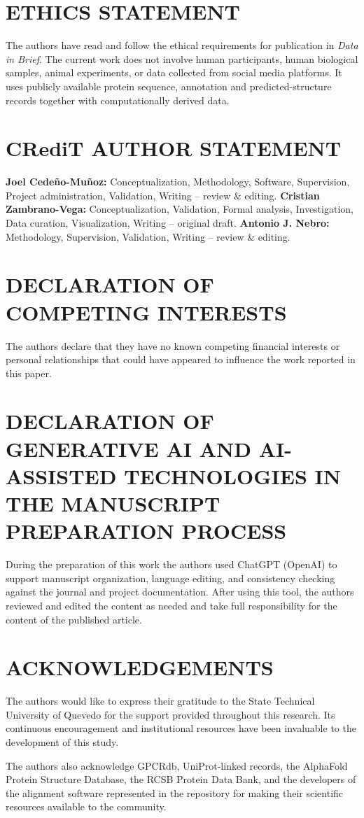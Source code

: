 \documentclass[a4paper,12pt]{article}
\begin{document}
	\section*{ETHICS STATEMENT}
	The authors have read and follow the ethical requirements for publication in \textit{Data in Brief}. The current work does not involve human participants, human biological samples, animal experiments, or data collected from social media platforms. It uses publicly available protein sequence, annotation and predicted-structure records together with computationally derived data.
	
	\section*{CRediT AUTHOR STATEMENT}
	 \textbf{Joel Cede\~no-Mu\~noz:} Conceptualization, Methodology, Software, Supervision, Project administration, Validation, Writing -- review \& editing. \textbf{Cristian Zambrano-Vega:} Conceptualization, Validation, Formal analysis, Investigation, Data curation, Visualization, Writing -- original draft. \textbf{Antonio J. Nebro:} Methodology, Supervision, Validation, Writing -- review \& editing.
	
	\section*{DECLARATION OF COMPETING INTERESTS}
	The authors declare that they have no known competing financial interests or personal relationships that could have appeared to influence the work reported in this paper.
	
	\section*{DECLARATION OF GENERATIVE AI AND AI-ASSISTED TECHNOLOGIES IN THE MANUSCRIPT PREPARATION PROCESS}
	During the preparation of this work the authors used ChatGPT (OpenAI) to support manuscript organization, language editing, and consistency checking against the journal and project documentation. After using this tool, the authors reviewed and edited the content as needed and take full responsibility for the content of the published article.
	
	\section*{ACKNOWLEDGEMENTS}
	The authors would like to express their gratitude to the State Technical University of Quevedo for the support provided throughout this research. Its continuous encouragement and institutional resources have been invaluable to the development of this study.
	
	The authors also acknowledge GPCRdb, UniProt-linked records, the AlphaFold Protein Structure Database, the RCSB Protein Data Bank, and the developers of the alignment software represented in the repository for making their scientific resources available to the community.
	
	\renewcommand{\refname}{REFERENCES}
	
	
\end{document}
